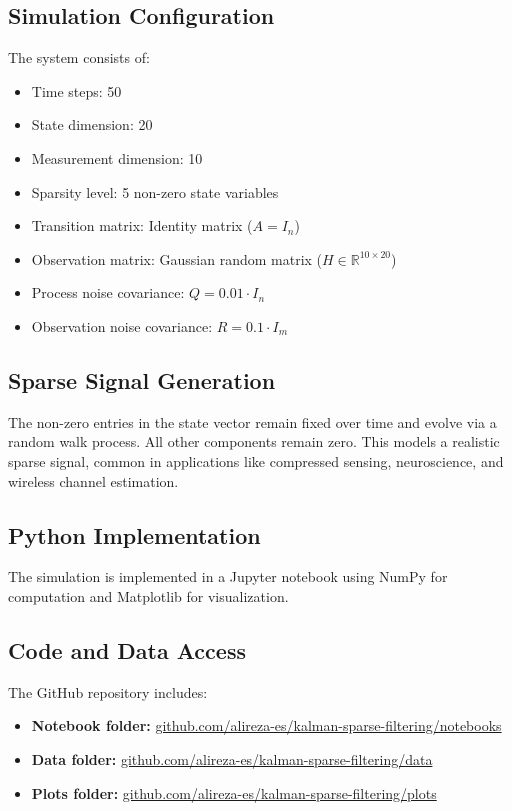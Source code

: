 \documentclass[12pt]{article}
\begin{document}
\subsection{Simulation Configuration}
The system consists of:
\begin{itemize}
  \item Time steps: 50
  \item State dimension: 20
  \item Measurement dimension: 10
  \item Sparsity level: 5 non-zero state variables
  \item Transition matrix: Identity matrix ($A = I_n$)
  \item Observation matrix: Gaussian random matrix ($H \in \mathbb{R}^{10 \times 20}$)
  \item Process noise covariance: $Q = 0.01 \cdot I_n$
  \item Observation noise covariance: $R = 0.1 \cdot I_m$
\end{itemize}

\subsection{Sparse Signal Generation}
The non-zero entries in the state vector remain fixed over time and evolve via a random walk process. All other components remain zero. This models a realistic sparse signal, common in applications like compressed sensing, neuroscience, and wireless channel estimation.

\subsection{Python Implementation}
The simulation is implemented in a Jupyter notebook using NumPy for computation and Matplotlib for visualization.

\subsection{Code and Data Access}
The GitHub repository includes:
\begin{itemize}
  \item \textbf{Notebook folder:} \href{https://github.com/alireza-es/kalman-sparse-filtering/tree/main/notebooks}{github.com/alireza-es/kalman-sparse-filtering/notebooks}
  \item \textbf{Data folder:} \href{https://github.com/alireza-es/kalman-sparse-filtering/tree/main/data}{github.com/alireza-es/kalman-sparse-filtering/data}
  \item \textbf{Plots folder:} \href{https://github.com/alireza-es/kalman-sparse-filtering/tree/main/plots}{github.com/alireza-es/kalman-sparse-filtering/plots}
\end{itemize}
\end{document}
